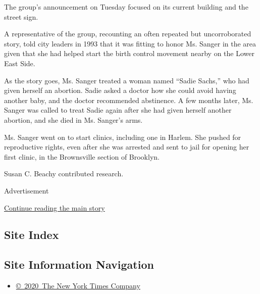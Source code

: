 The group's announcement on Tuesday focused on its current building and
the street sign.

A representative of the group, recounting an often repeated but
uncorroborated story, told city leaders in 1993 that it was fitting to
honor Ms. Sanger in the area given that she had helped start the birth
control movement nearby on the Lower East Side.

As the story goes, Ms. Sanger treated a woman named ``Sadie Sachs,'' who
had given herself an abortion. Sadie asked a doctor how she could avoid
having another baby, and the doctor recommended abstinence. A few months
later, Ms. Sanger was called to treat Sadie again after she had given
herself another abortion, and she died in Ms. Sanger's arms.

Ms. Sanger went on to start clinics, including one in Harlem. She pushed
for reproductive rights, even after she was arrested and sent to jail
for opening her first clinic, in the Brownsville section of Brooklyn.

Susan C. Beachy contributed research.

Advertisement

\protect\hyperlink{after-bottom}{Continue reading the main story}

\hypertarget{site-index}{%
\subsection{Site Index}\label{site-index}}

\hypertarget{site-information-navigation}{%
\subsection{Site Information
Navigation}\label{site-information-navigation}}

\begin{itemize}
\tightlist
\item
  \href{https://help.nytimes3xbfgragh.onion/hc/en-us/articles/115014792127-Copyright-notice}{©~2020~The
  New York Times Company}
\end{itemize}

